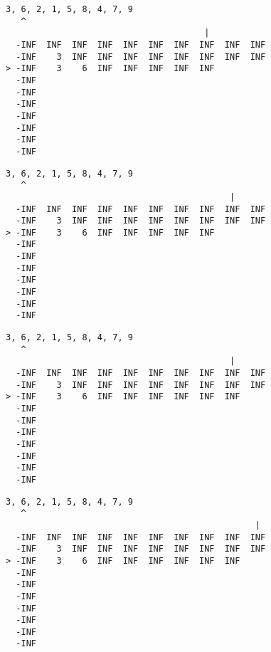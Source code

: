 { \begin{verbatim}
3, 6, 2, 1, 5, 8, 4, 7, 9
   ^
                                       |
  -INF  INF  INF  INF  INF  INF  INF  INF  INF  INF
  -INF    3  INF  INF  INF  INF  INF  INF  INF  INF
> -INF    3    6  INF  INF  INF  INF  INF          
  -INF                                             
  -INF                                             
  -INF                                             
  -INF                                             
  -INF                                             
  -INF                                             
  -INF                                             
\end{verbatim} }

{ \begin{verbatim}
3, 6, 2, 1, 5, 8, 4, 7, 9
   ^
                                            |
  -INF  INF  INF  INF  INF  INF  INF  INF  INF  INF
  -INF    3  INF  INF  INF  INF  INF  INF  INF  INF
> -INF    3    6  INF  INF  INF  INF  INF          
  -INF                                             
  -INF                                             
  -INF                                             
  -INF                                             
  -INF                                             
  -INF                                             
  -INF                                             
\end{verbatim} }

{ \begin{verbatim}
3, 6, 2, 1, 5, 8, 4, 7, 9
   ^
                                            |
  -INF  INF  INF  INF  INF  INF  INF  INF  INF  INF
  -INF    3  INF  INF  INF  INF  INF  INF  INF  INF
> -INF    3    6  INF  INF  INF  INF  INF  INF     
  -INF                                             
  -INF                                             
  -INF                                             
  -INF                                             
  -INF                                             
  -INF                                             
  -INF                                             
\end{verbatim} }

{ \begin{verbatim}
3, 6, 2, 1, 5, 8, 4, 7, 9
   ^
                                                 |
  -INF  INF  INF  INF  INF  INF  INF  INF  INF  INF
  -INF    3  INF  INF  INF  INF  INF  INF  INF  INF
> -INF    3    6  INF  INF  INF  INF  INF  INF     
  -INF                                             
  -INF                                             
  -INF                                             
  -INF                                             
  -INF                                             
  -INF                                             
  -INF                                             
\end{verbatim} }

